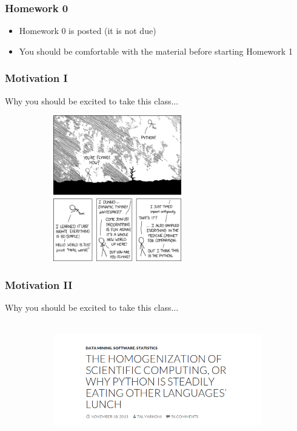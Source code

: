 \documentclass{beamer}
\begin{document}
\begin{frame}
\frametitle{Homework 0}

\begin{itemize}
\setlength{\itemsep}{0.2in}
\item{Homework 0 is posted (it is not due)}
\item{You should be comfortable with the material before starting Homework 1}
\end{itemize}

\end{frame}


\begin{frame}
\frametitle{Motivation I}
Why you should be excited to take this class...

\begin{figure}
    \centering
	\begin{subfigure}[b]{\textwidth}
	\centering
	\includegraphics[height=2.5in]{"images/python"}
	\label{fig:xkcd}
	\end{subfigure}
\end{figure}

\end{frame}

\begin{frame}
\frametitle{Motivation II}
Why you should be excited to take this class...

\begin{figure}
    \centering
	\begin{subfigure}[b]{\textwidth}
	\centering
	\includegraphics[height=2.0in]{"images/python_screenshot"}
	\label{fig:xkcd}
	\end{subfigure}
\end{figure}

\end{frame}
\end{document}
